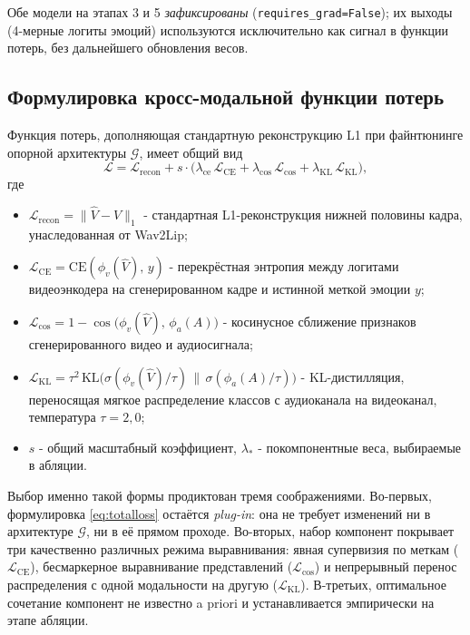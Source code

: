 \documentclass[a4paper, 12pt, oneside, openany]{article}
\begin{document}
Обе модели на этапах 3 и 5 \textit{зафиксированы} (\texttt{requires\_grad=False}); их выходы (4-мерные логиты эмоций) используются исключительно как сигнал в функции потерь, без дальнейшего обновления весов.

\subsection{Формулировка кросс-модальной функции потерь}

Функция потерь, дополняющая стандартную реконструкцию L1 при файнтюнинге опорной архитектуры $\mathcal{G}$, имеет общий вид
\begin{equation}\label{eq:totalloss}
\mathcal{L} = \mathcal{L}_{\text{recon}} + s \cdot \big(\lambda_{\text{ce}}\,\mathcal{L}_{\text{CE}} + \lambda_{\cos}\,\mathcal{L}_{\cos} + \lambda_{\text{KL}}\,\mathcal{L}_{\text{KL}}\big),
\end{equation}
где
\begin{itemize}
\item $\mathcal{L}_{\text{recon}} = \|\hat{V} - V\|_1$ - стандартная L1-реконструкция нижней половины кадра, унаследованная от Wav2Lip;
\item $\mathcal{L}_{\text{CE}} = \mathrm{CE}(\phi_v(\hat{V}),\, y)$ - перекрёстная энтропия между логитами видеоэнкодера на сгенерированном кадре и истинной меткой эмоции $y$;
\item $\mathcal{L}_{\cos} = 1 - \cos\!\bigl(\phi_v(\hat V),\, \phi_a(A)\bigr)$ - косинусное сближение признаков сгенерированного видео и аудиосигнала;
\item $\mathcal{L}_{\text{KL}} = \tau^2\,\mathrm{KL}\!\bigl(\sigma(\phi_v(\hat V)/\tau)\,\|\,\sigma(\phi_a(A)/\tau)\bigr)$ - KL-дистилляция, переносящая мягкое распределение классов с аудиоканала на видеоканал, температура $\tau=2{,}0$;
\item $s$ - общий масштабный коэффициент, $\lambda_{*}$ - покомпонентные веса, выбираемые в абляции.
\end{itemize}

Выбор именно такой формы продиктован тремя соображениями. Во-первых, формулировка \eqref{eq:totalloss} остаётся \textit{plug-in}: она не требует изменений ни в архитектуре $\mathcal{G}$, ни в её прямом проходе. Во-вторых, набор компонент покрывает три качественно различных режима выравнивания: явная супервизия по меткам ($\mathcal{L}_{\text{CE}}$), бесмаркерное выравнивание представлений ($\mathcal{L}_{\cos}$) и непрерывный перенос распределения с одной модальности на другую ($\mathcal{L}_{\text{KL}}$). В-третьих, оптимальное сочетание компонент не известно a priori и устанавливается эмпирически на этапе абляции.
\end{document}
